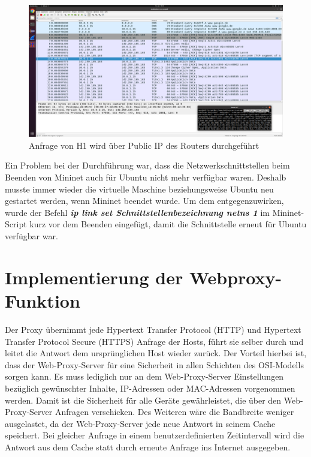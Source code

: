 \documentclass[fontsize=12pt,paper=a4,open=any,parskip=half,
  twoside=false,toc=listof,toc=bibliography,fleqn,leqno,
  captions=nooneline,captions=tableabove,british]{scrbook}
\begin{document}
\begin{figure}[H]
 \centering
 \includegraphics[width=1.0\textwidth]{Bilder/nat}
 \captionsetup{justification=centering,margin=2cm}
 \caption{Anfrage von H1 wird über Public IP des Routers durchgeführt}
 \label{nat}
\end{figure}

Ein Problem bei der Durchführung war, dass die Netzwerkschnittstellen beim Beenden von Mininet auch für Ubuntu nicht mehr verfügbar waren. Deshalb musste immer wieder die virtuelle Maschine beziehungsweise Ubuntu neu gestartet werden, wenn Mininet beendet wurde. Um dem entgegenzuwirken, wurde der Befehl \textit{\textbf{ip link set Schnittstellenbezeichnung netns 1}} im Mininet-Script kurz vor dem Beenden eingefügt, damit die Schnittstelle erneut für Ubuntu verfügbar war.

\section{Implementierung der Webproxy-Funktion}
Der Proxy übernimmt jede Hypertext Transfer Protocol (HTTP) und Hypertext Transfer Protocol Secure (HTTPS) Anfrage der Hosts, führt sie selber durch und leitet die Antwort dem ursprünglichen Host wieder zurück. Der Vorteil hierbei ist, dass der Web-Proxy-Server für eine Sicherheit in allen Schichten des OSI-Modells sorgen kann. Es muss lediglich nur an dem Web-Proxy-Server Einstellungen bezüglich gewünschter Inhalte, IP-Adressen oder MAC-Adressen vorgenommen werden. Damit ist die Sicherheit für alle Geräte gewährleistet, die über den Web-Proxy-Server Anfragen verschicken. Des Weiteren wäre die Bandbreite weniger ausgelastet, da der Web-Proxy-Server jede neue Antwort in seinem Cache speichert. Bei gleicher Anfrage in einem benutzerdefinierten Zeitintervall wird die Antwort aus dem Cache statt durch erneute Anfrage ins Internet ausgegeben.
\end{document}
